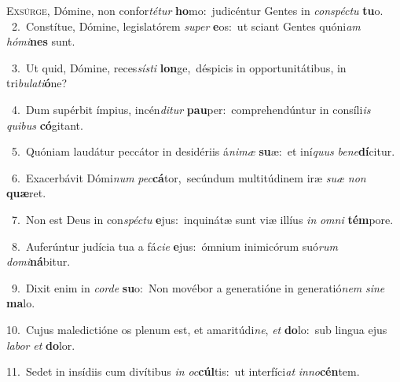 \lettrine{\initial\textcolor{\initialcolor}{E}}{xsúrge,} Dómine, non confor\-\textit{té}\-\textit{tur} \textbf{ho}\-mo:~\star judicéntur Gentes in \textit{con}\-\textit{spéc}\textit{tu} \textbf{tu}\-o.\\
{\numbfont\textcolor{\numbcolor}{~2.}}~Constítue, Dómine, legislatórem \textit{su}\-\textit{per} \textbf{e}\-os:~\star ut sciant Gentes quóni\textit{am} \textit{hó}\-\textit{mi}\textbf{nes} sunt.\par
{\numbfont\textcolor{\numbcolor}{~3.}}~Ut quid, Dómine, reces\-\textit{sís}\-\textit{ti} \textbf{lon}\-ge,~\star déspicis in opportunitátibus, in tri\-\textit{bu}\-\textit{la}\textit{ti}\textbf{ó}ne?\par
{\numbfont\textcolor{\numbcolor}{~4.}}~Dum supérbit ímpius, incén\-\textit{di}\-\textit{tur} \textbf{pau}\-per:~\star comprehendúntur in consíli\textit{is} \textit{qui}\-\textit{bus} \textbf{có}\-gitant.\par
{\numbfont\textcolor{\numbcolor}{~5.}}~Quóniam laudátur peccátor in desidériis á\-\textit{ni}\-\textit{mæ} \textbf{su}\-æ:~\star et iní\textit{quus} \textit{be}\-\textit{ne}\textbf{dí}citur.\par
{\numbfont\textcolor{\numbcolor}{~6.}}~Exacerbávit Dómi\textit{num} \textit{pec}\-\textbf{cá}tor,~\star secúndum multitúdinem iræ \textit{su}\-\textit{æ} \textit{non} \textbf{quæ}\-ret.\par
{\numbfont\textcolor{\numbcolor}{~7.}}~Non est Deus in con\-\textit{spéc}\-\textit{tu} \textbf{e}\-jus:~\star inquinátæ sunt viæ illíus \textit{in} \textit{om}\-\textit{ni} \textbf{tém}\-pore.\par
{\numbfont\textcolor{\numbcolor}{~8.}}~Auferúntur judícia tua a fá\-\textit{ci}\-\textit{e} \textbf{e}\-jus:~\star ómnium inimicórum suó\textit{rum} \textit{do}\-\textit{mi}\textbf{ná}bitur.\par
{\numbfont\textcolor{\numbcolor}{~9.}}~Dixit enim in \textit{cor}\-\textit{de} \textbf{su}\-o:~\star Non movébor a generatióne in generatió\textit{nem} \textit{si}\-\textit{ne} \textbf{ma}\-lo.\par
{\numbfont\textcolor{\numbcolor}{10.}}~Cujus maledictióne os plenum est, et amaritúdi\-\textit{ne}\-, \textit{et} \textbf{do}\-lo:~\star sub lingua ejus \textit{la}\-\textit{bor} \textit{et} \textbf{do}\-lor.\par
{\numbfont\textcolor{\numbcolor}{11.}}~Sedet in insídiis cum divítibus \textit{in} \textit{oc}\-\textbf{cúl}tis:~\star ut interfíci\textit{at} \textit{in}\-\textit{no}\textbf{cén}tem.\par
